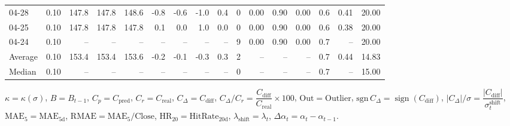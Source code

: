 \begin{threeparttable}
{\begin{tabular}{lrrrrrrrrrrrrrrr}
  04-28 &     0.10 & 147.8 & 147.8 & 148.6 &       -0.8 &           -0.6 &                     -1.0 &                 0.4 &              0 &       0.00 &      0.90 &           0.00 &              0.6 &            0.41 &                  20.00 \\
  04-25 &     0.10 & 147.8 & 147.8 & 147.8 &        0.1 &            0.0 &                      1.0 &                 0.0 &              0 &       0.00 &      0.90 &           0.00 &              0.6 &            0.38 &                  20.00 \\
  04-24 &     0.10 &    -- &    -- &    -- &         -- &             -- &                       -- &                  -- &              9 &       0.00 &      0.90 &           0.00 &              0.7 &              -- &                  20.00 \\
Average &     0.10 & 153.4 & 153.4 & 153.6 &       -0.2 &           -0.1 &                     -0.3 &                 0.3 &              2 &         -- &        -- &             -- &              0.7 &            0.44 &                  14.83 \\
 Median &     0.10 &    -- &    -- &    -- &         -- &             -- &                       -- &                  -- &              0 &         -- &        -- &             -- &              0.7 &              -- &                  15.00 \\
\bottomrule
\end{tabular}
}
\begin{tablenotes}\footnotesize
\item $\kappa=\kappa(\sigma)$, $B=B_{t-1}$, $C_p=C_{\text{pred}}$, $C_r=C_{\text{real}}$, $C_\Delta=C_{\text{diff}}$, $C_\Delta/C_r=\dfrac{C_{\text{diff}}}{C_{\text{real}}}\times100$, $\mathrm{Out}=\text{Outlier}$, $\mathrm{sgn}\,C_\Delta=\operatorname{sign}(C_{\text{diff}})$, $|C_\Delta|/\sigma=\dfrac{|C_{\text{diff}}|}{\sigma_t^{\text{shift}}}$, $\mathrm{MAE}_5=\mathrm{MAE}_{5\text{d}}$, $\mathrm{RMAE}= \mathrm{MAE}_5 / \text{Close}$, $\mathrm{HR}_{20}=\mathrm{HitRate}_{20\text{d}}$, 
$\lambda_{\text{shift}}=\lambda_t$, 
$\Delta\alpha_t=\alpha_t-\alpha_{t-1}$.
\end{tablenotes}
\end{threeparttable}
\endgroup

